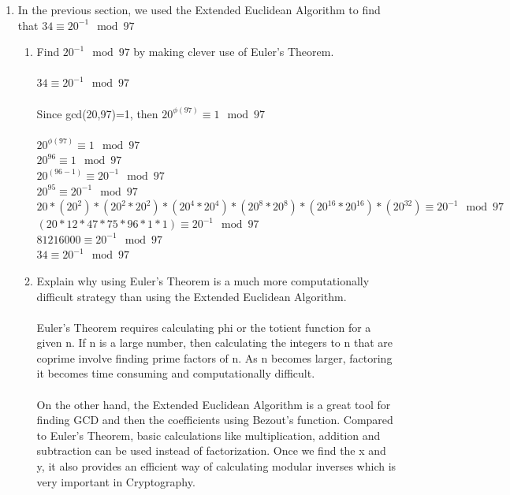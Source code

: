 \documentclass[]{article}
\begin{document}
\begin{enumerate}
    \item In the previous section, we used the Extended Euclidean Algorithm to find that $34 \equiv 20^{-1} \mod 97$
    \begin{enumerate}
        \item Find $20^{-1} \mod 97$ by making clever use of Euler's Theorem.
        \\\\$34 \equiv 20^{-1} \mod 97$
        \\\\Since gcd(20,97)=1, then $20^{\phi(97)} \equiv 1 \mod 97$
        \\\\$20^{\phi(97)} \equiv 1 \mod 97$
        \\$20^{96} \equiv 1 \mod 97$
        \\$20^{(96-1)} \equiv 20^{-1} \mod 97$
        \\$20^{95} \equiv 20^{-1} \mod 97$
        \\$20*(20^2)*(20^2*20^2)*(20^4*20^4)*(20^8*20^8)*(20^{16}*20^{16})*(20^{32}) \equiv 20^{-1} \mod 97$
        \\$(20*12*47*75*96*1*1) \equiv 20^{-1} \mod 97$
        \\$81216000 \equiv 20^{-1} \mod 97$
        \\$34 \equiv 20^{-1} \mod 97$
        \item Explain why using Euler's Theorem is a much more computationally difficult strategy than using the Extended Euclidean Algorithm.
        \\\\Euler’s Theorem requires calculating phi or the totient function for a given n. If n is a large number, then calculating the integers to n that are coprime involve finding prime factors of n. As n becomes larger, factoring it becomes time consuming and computationally difficult. 
        \\\\On the other hand, the Extended Euclidean Algorithm is a great tool for finding GCD and then the coefficients using Bezout’s function. Compared to Euler’s Theorem, basic calculations like multiplication, addition and subtraction can be used instead of factorization. Once we find the x and y, it also provides an efficient way of calculating modular inverses which is very important in Cryptography.
    \end{enumerate}

    
\end{enumerate}
\end{document}
